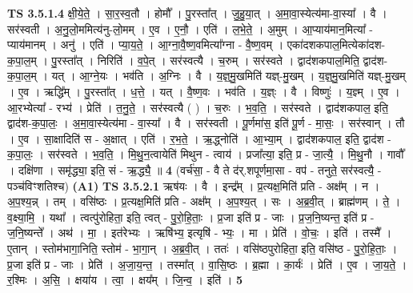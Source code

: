 \documentclass[17pt]{extarticle}
\begin{document}
                  \newline
                                \textbf{ TS 3.5.1.4} \newline
                  क्षी॒ये॒ते॒ । सा॒र॒स्व॒तौ । होमौ᳚ । पु॒रस्ता᳚त् । जु॒हु॒या॒त् । अ॒मा॒वा॒स्येत्य॑मा-वा॒स्या᳚ । वै । सर॑स्वती । अ॒नु॒लो॒ममित्य॑नु-लो॒मम् । ए॒व । ए॒नौ॒ । एति॑ । ल॒भे॒ते॒ । अ॒मुम् । आ॒प्याय॑मान॒मित्या᳚ - प्याय॑मानम् । अनु॑ । एति॑ । प्या॒य॒ते॒ । आ॒ग्ना॒वै॒ष्ण॒वमित्या᳚ग्ना - वै॒ष्ण॒वम् । एका॑दशकपाल॒मित्येका॑दश-क॒पा॒ल॒म् । पु॒रस्ता᳚त् । निरिति॑ । व॒पे॒त् । सर॑स्वत्यै । च॒रुम् । सर॑स्वते । द्वाद॑शकपाल॒मिति॒ द्वाद॑श-क॒पा॒ल॒म् । यत् । आ॒ग्ने॒यः । भव॑ति । अ॒ग्निः । वै । य॒ज्ञ्॒मु॒खमिति॑ यज्ञ्-मु॒खम् । य॒ज्ञ्॒मु॒खमिति॑ यज्ञ्-मु॒खम् । ए॒व । ऋद्धि᳚म् । पु॒रस्ता᳚त् । ध॒त्ते॒ । यत् । वै॒ष्ण॒वः । भव॑ति । य॒ज्ञ्ः । वै । विष्णुः॑ । य॒ज्ञ्म् । ए॒व । आ॒रभ्येत्या᳚ - रभ्य॑ । प्रेति॑ । त॒नु॒ते॒ । सर॑स्वत्यै ( ) । च॒रुः । भ॒व॒ति॒ । सर॑स्वते । द्वाद॑शकपाल॒ इति॒ द्वाद॑श-क॒पा॒लः॒ । अ॒मा॒वा॒स्येत्य॑मा - वा॒स्या᳚ । वै । सर॑स्वती । पू॒र्णमा॑स॒ इति॑ पू॒र्ण - मा॒सः॒ । सर॑स्वान् । तौ । ए॒व । सा॒क्षादिति॑ स - अ॒क्षात् । एति॑ । र॒भ॒ते॒ । ऋ॒द्ध्नोति॑ । आ॒भ्या॒म् । द्वाद॑शकपाल॒ इति॒ द्वाद॑श - क॒पा॒लः॒ । सर॑स्वते । भ॒व॒ति॒ । मि॒थु॒न॒त्वायेति॑ मिथुन - त्वाय॑ । प्रजा᳚त्या॒ इति॒ प्र - जा॒त्यै॒ । मि॒थु॒नौ । गावौ᳚ । दक्षि॑णा । समृ॑द्ध्या॒ इति॒ सं - ऋ॒द्ध्यै॒ ॥ \textbf{  4} \newline
                  \newline
                      (वर्च॑सा॒ - वै ते द॑र्.शपूर्णमा॒सा - वप॑ - तनुते॒ सर॑स्वत्यै॒ - पञ्च॑विꣳशतिश्च)  \textbf{(A1)} \newline \newline
                                \textbf{ TS 3.5.2.1} \newline
                  ऋष॑यः । वै । इन्द्र᳚म् । प्र॒त्यक्ष॒मिति॑ प्रति - अक्ष᳚म् । न । अ॒प॒श्य॒न्न् । तम् । वसि॑ष्ठः । प्र॒त्यक्ष॒मिति॑ प्रति - अक्ष᳚म् । अ॒प॒श्य॒त् । सः । अ॒ब्र॒वी॒त् । ब्राह्म॑णम् । ते॒ । व॒क्ष्या॒मि॒ । यथा᳚ । त्वत्पु॑रोहिता॒ इति॒ त्वत् - पु॒रो॒हि॒ताः॒ । प्र॒जा इति॑ प्र - जाः । प्र॒ज॒नि॒ष्यन्त॒ इति॑ प्र - ज॒नि॒ष्यन्ते᳚ । अथ॑ । मा॒ । इत॑रेभ्यः । ऋषि॑भ्य॒ इत्यृषि॑ - भ्यः॒ । मा । प्रेति॑ । वो॒चः॒ । इति॑ । तस्मै᳚ । ए॒तान् । स्तोम॑भागा॒निति॒ स्तोम॑ - भा॒गा॒न् । अ॒ब्र॒वी॒त् । ततः॑ । वसि॑ष्ठपुरोहिता॒ इति॒ वसि॑ष्ठ - पु॒रो॒हि॒ताः॒ । प्र॒जा इति॑ प्र - जाः । प्रेति॑ । अ॒जा॒य॒न्त॒ । तस्मा᳚त् । वा॒सि॒ष्ठः । ब्र॒ह्मा । का॒र्यः॑ । प्रेति॑ । ए॒व । जा॒य॒ते॒ । र॒श्मिः । अ॒सि॒ । क्षया॑य । त्वा॒ । क्षय᳚म् । जि॒न्व॒ । इति॑ । \textbf{  5} \newline
                  \newline
\end{document}
